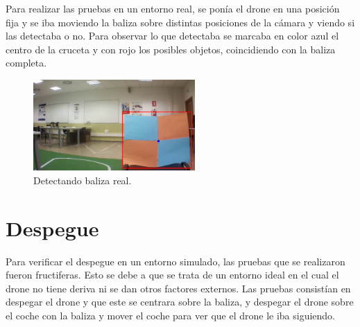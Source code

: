 \hspace{1cm} Para realizar las pruebas en un entorno real, se pon\'ia el drone en una posici\'on fija y se iba moviendo la baliza sobre distintas posiciones de la c\'amara y viendo si las detectaba o no. Para observar lo que detectaba se marcaba en color azul el centro de la cruceta y con rojo los posibles objetos, coincidiendo con la baliza completa.

\begin{figure}[H]
	\centering
		\includegraphics[width=0.55\textwidth]{imgs/k_beacon21.jpg}
		\caption{Detectando baliza real.}
	\label{fig:Detectando baliza real.}
\end{figure}

\section{Despegue}


\hspace{1cm} Para verificar el despegue en un entorno simulado, las pruebas que se realizaron fueron fructiferas. Esto se debe a que se trata de un entorno ideal en el cual el drone no tiene deriva ni se dan otros factores externos. Las pruebas consist\'ian en despegar el drone y que este se centrara sobre la baliza, y despegar el drone sobre el coche con la baliza y mover el coche para ver que el drone le iba siguiendo.%

